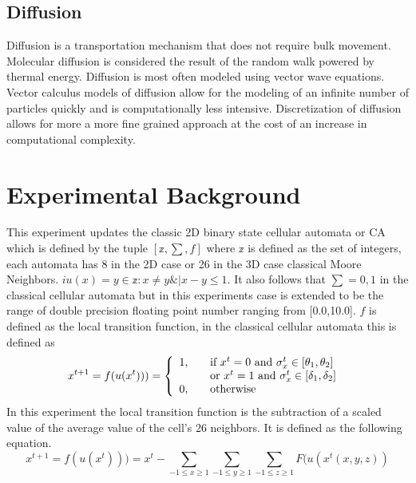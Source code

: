 \documentclass[11pt,twocolumn]{article}
\begin{document}
 \subsection{Diffusion}
 Diffusion is a transportation mechanism that does not require bulk movement. 
 Molecular diffusion is considered the result of the random walk powered by thermal energy. \cite{appert}
 Diffusion is most often modeled using vector wave equations. Vector calculus models of diffusion allow for the modeling of an infinite number of particles quickly and is computationally less intensive.\cite{Tomas1} 
 Discretization of diffusion allows for more a more fine grained approach at the cost of an increase in computational complexity.\cite{newman99}
\section{Experimental Background}
This experiment updates the classic 2D binary state cellular automata or CA which is defined by 
the tuple $[ \mathbb{z},\sum,f ]$ where $\mathbb{z}$ is defined as the set of integers, 
each automata has 8 in the 2D case or 26 in the 3D case classical Moore Neighbors. 
$i u(x)={y \in \mathbb{z}: x \ne y \& |x-y \leq 1} $. It also follows that $\sum ={0,1}$ in the classical cellular automata but in this experiments case is extended to be the range of double precision floating point number ranging from [0.0,10.0]. $f$ is defined as the local transition function, in the classical cellular automata this is defined as\cite{watts99}\cite{watts98}
\begin{equation}
x^{t+1}=f(u(x^{t}))) = \left\{ 
  \begin{array}{l l}
    1, & \quad \textrm{if $x^{t} =0$ and $\sigma_{x}^{t} \in [\theta_{1},\theta_{2}]$ }\\
       & \quad \textrm{or $x^{t} = 1$ and $\sigma^{t}_{x} \in [\delta_{1},\delta_{2}]$ }\\
    0, & \quad \textrm{otherwise} \\
  \end{array} \right.
\end{equation}  
In this experiment the local transition function is the subtraction of a scaled value of the average value of the 
cell's 26 neighbors. It is defined as the following equation.
\begin{equation} 
x^{t+1}=f(u(x^{t}))) = x^{t} - \sum_{-1 \leq x \geq 1} \sum_{-1 \leq y \geq 1} \sum_{-1 \leq z \geq 1} F(u(x^{t}(x,y,z))
\end{equation} 
\end{document}
